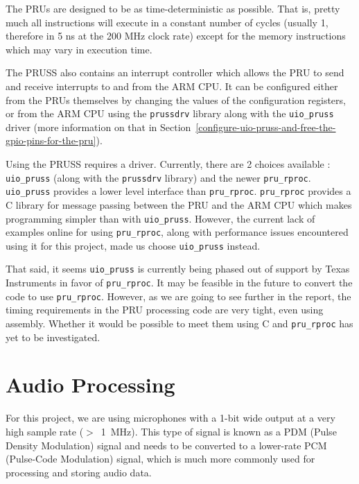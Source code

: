 \documentclass[]{report}
\begin{document}
The PRUs are designed to be as time-deterministic as possible. That is, pretty much all instructions will execute in a constant number of cycles (usually 1, therefore in 5 ns at the 200 MHz clock rate) except for the memory instructions which may vary in execution time.

The PRUSS also contains an interrupt controller which allows the PRU to send and receive interrupts to and from the ARM CPU. It can be configured either from the PRUs themselves by changing the values of the configuration registers, or from the ARM CPU using the \texttt{prussdrv} library along with the \texttt{uio\_pruss} driver (more information on that in Section~\ref{configure-uio-pruss-and-free-the-gpio-pins-for-the-pru}).

Using the PRUSS requires a driver. Currently, there are 2 choices available : \texttt{uio\_pruss} (along with the \texttt{prussdrv} library) and the newer \texttt{pru\_rproc}. \texttt{uio\_pruss} provides a lower level interface than \texttt{pru\_rproc}. \texttt{pru\_rproc} provides a C library for message passing between the PRU and the ARM CPU which makes programming simpler than with \texttt{uio\_pruss}. However, the current lack of examples online for using \texttt{pru\_rproc}, along with performance issues encountered using it for this project, made us choose \texttt{uio\_pruss} instead.

That said, it seems \texttt{uio\_pruss} is currently being phased out of support by Texas Instruments in favor of \texttt{pru\_rproc}. It may be feasible in the future to convert the code to use \texttt{pru\_rproc}. However, as we are going to see further in the report, the timing requirements in the PRU processing code are very tight, even using assembly. Whether it would be possible to meet them using C and \texttt{pru\_rproc} has yet to be investigated.

\hypertarget{audio-processing}{%
\section{Audio Processing}\label{audio-processing}}

For this project, we are using microphones with a 1-bit wide output at a very high sample rate ($ > $~1~MHz). This type of signal is known as a PDM (Pulse Density Modulation) signal and needs to be converted to a lower-rate PCM (Pulse-Code Modulation) signal, which is much more commonly used for processing and storing audio data.
\end{document}
